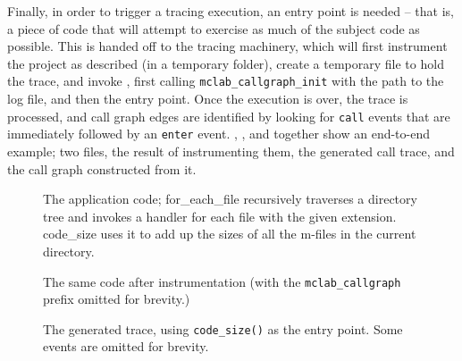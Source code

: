 Finally, in order to trigger a tracing execution, an entry point is needed --
that is, a piece of code that will attempt to exercise as much of the subject
code as possible. This is handed off to the tracing machinery, which will first
instrument the project as described (in a temporary folder), create a temporary
file to hold the trace, and invoke \matlab, first calling
\texttt{mclab\_callgraph\_init} with the path to the log file, and then the
entry point. Once the execution is over, the trace is processed, and call
graph edges are identified by looking for \texttt{call} events that are
immediately followed by an \texttt{enter} event. ,
,  and 
together show an end-to-end example; two \matlab files, the result of
instrumenting them, the generated call trace, and the call graph constructed
from it.

\begin{figure}[htbp]
\begin{minipage}{\linewidth}
  
\end{minipage}
\begin{minipage}{\linewidth}
  
\end{minipage}
\caption{The application code; for\_each\_file recursively traverses a directory
tree and invokes a handler for each file with the given extension. code\_size
uses it to add up the sizes of all the m-files in the current directory.}
\label{Fig:CallgraphBefore}
\end{figure}

\begin{figure}[htbp]
\begin{minipage}{\linewidth}
  
\end{minipage}
\begin{minipage}{\linewidth}
  
\end{minipage}
\caption{The same code after instrumentation (with the \texttt{mclab\_callgraph}
prefix omitted for brevity.)}
\label{Fig:CallgraphAfter}
\end{figure}

\begin{figure}[htbp]

\caption{The generated trace, using \texttt{code\_size()} as the entry point.
Some events are omitted for brevity.}
\label{Fig:CallgraphTrace}
\end{figure}

